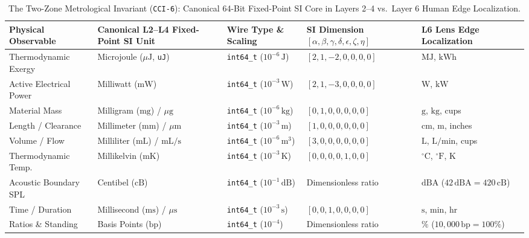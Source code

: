 \begin{table}[htbp]
\centering
\small
\setlength{\tabcolsep}{3.5pt}
\begin{tabular}{|p{}|p{}|p{}|p{}|p{}|}
\hline
\textbf{Physical Observable} & \textbf{Canonical L2--L4 Fixed-Point SI Unit} & \textbf{Wire Type \& Scaling} & \textbf{SI Dimension $[\alpha,\beta,\gamma,\delta,\epsilon,\zeta,\eta]$} & \textbf{L6 Lens Edge Localization} \\
\hline
Thermodynamic Exergy & Microjoule ($\mu\mathrm{J}$, \texttt{uJ}) & \texttt{int64\_t} ($10^{-6}\,\mathrm{J}$) & $[2, 1, -2, 0, 0, 0, 0]$ & $\mathrm{MJ}$, $\mathrm{kWh}$ \\
Active Electrical Power & Milliwatt ($\mathrm{mW}$) & \texttt{int64\_t} ($10^{-3}\,\mathrm{W}$) & $[2, 1, -3, 0, 0, 0, 0]$ & $\mathrm{W}$, $\mathrm{kW}$ \\
Material Mass & Milligram ($\mathrm{mg}$) / $\mu\mathrm{g}$ & \texttt{int64\_t} ($10^{-6}\,\mathrm{kg}$) & $[0, 1, 0, 0, 0, 0, 0]$ & $\mathrm{g}$, $\mathrm{kg}$, cups \\
Length / Clearance & Millimeter ($\mathrm{mm}$) / $\mu\mathrm{m}$ & \texttt{int64\_t} ($10^{-3}\,\mathrm{m}$) & $[1, 0, 0, 0, 0, 0, 0]$ & $\mathrm{cm}$, $\mathrm{m}$, inches \\
Volume / Flow & Milliliter ($\mathrm{mL}$) / $\mathrm{mL/s}$ & \texttt{int64\_t} ($10^{-6}\,\mathrm{m^3}$) & $[3, 0, 0, 0, 0, 0, 0]$ & $\mathrm{L}$, $\mathrm{L/min}$, cups \\
Thermodynamic Temp. & Millikelvin ($\mathrm{mK}$) & \texttt{int64\_t} ($10^{-3}\,\mathrm{K}$) & $[0, 0, 0, 0, 1, 0, 0]$ & $^\circ\mathrm{C}$, $^\circ\mathrm{F}$, $\mathrm{K}$ \\
Acoustic Boundary SPL & Centibel ($\mathrm{cB}$) & \texttt{int64\_t} ($10^{-1}\,\mathrm{dB}$) & Dimensionless ratio & $\mathrm{dBA}$ ($42\,\mathrm{dBA} = 420\,\mathrm{cB}$) \\
Time / Duration & Millisecond ($\mathrm{ms}$) / $\mu\mathrm{s}$ & \texttt{int64\_t} ($10^{-3}\,\mathrm{s}$) & $[0, 0, 1, 0, 0, 0, 0]$ & $\mathrm{s}$, $\mathrm{min}$, $\mathrm{hr}$ \\
Ratios \& Standing & Basis Points ($\mathrm{bp}$) & \texttt{int64\_t} ($10^{-4}$) & Dimensionless ratio & $\%$ ($10{,}000\,\mathrm{bp} = 100\%$) \\
\hline
\end{tabular}
\caption{The Two-Zone Metrological Invariant (\texttt{CCI-6}): Canonical 64-Bit Fixed-Point SI Core in Layers 2--4 vs.\ Layer 6 Human Edge Localization.}
\label{tab:l2_ontology_units}
\end{table}

